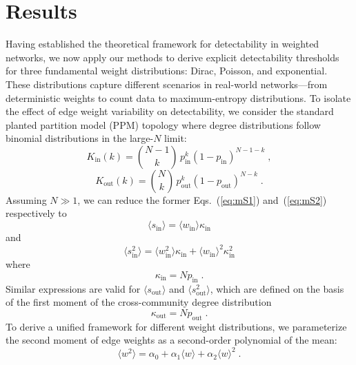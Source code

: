 \documentclass[a4paper,pre,superscriptaddress,floatfix,nofootinbib,twocolumn]{revtex4-1}
\begin{document}
\section*{Results}

Having established the theoretical framework for detectability in weighted networks, we now apply our methods to derive explicit detectability thresholds for three fundamental weight distributions: Dirac, Poisson, and exponential. These distributions capture different scenarios in real-world networks---from deterministic weights to count data to maximum-entropy distributions. To isolate the effect of edge weight variability on detectability, we consider the standard planted partition model (PPM) topology where degree distributions follow binomial distributions in the large-$N$ limit:
\begin{equation}
K_\text{in}(k) = {N-1 \choose k} \, p_{\text{in}}^{k} \left(1 - p_\text{in} \right)^{N-1-k}   \; ,
    \label{eq:standard1}
\end{equation}
\begin{equation}
K_\text{out}(k) = {N \choose k} \, p_{\text{out}}^{k} \left(1 - p_\text{out} \right)^{N-k}  \; .
    \label{eq:standard2}
\end{equation}
Assuming $N \gg 1$, we can reduce the former Eqs.~(\ref{eq:mS1}) and~(\ref{eq:mS2}) respectively to
\begin{equation}
    \langle s_\text{in}\rangle  = \langle w_\text{in} \rangle \kappa_\text{in}
    \label{eq:mS1a}
\end{equation}
and
\begin{equation}
\langle s_\text{in}^2 \rangle = \langle w^2_\text{in} \rangle \kappa_\text{in} + \langle w_\text{in} \rangle^2 \kappa_\text{in}^2
 \label{eq:mS2a}
\end{equation}
where
\begin{equation}
\kappa_\text{in} = N p_{\text{in}} \; .
\label{eq:kappa_in}
\end{equation}
Similar expressions are valid for $\langle s_\text{out}\rangle$ and $\langle s_\text{out}^2\rangle$, which are defined
on the basis of the first moment of the cross-community degree distribution
\begin{equation}
\kappa_\text{out} = N p_{\text{out}} \; .
\label{eq:kappa_out}
\end{equation}
To derive a unified framework for different weight distributions, we parameterize the second moment of edge weights as a second-order polynomial of the mean:
\begin{equation}
\langle w^2 \rangle = \alpha_0 + \alpha_1 \langle w \rangle + \alpha_2 \langle w \rangle^2 \; .
\label{eq:second_order_polynomial}
\end{equation}
\end{document}

